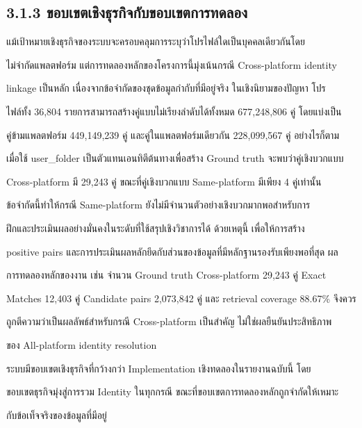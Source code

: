 \documentclass[12pt,a4paper]{report}
\begin{document}
\subsection*{3.1.3 ขอบเขตเชิงธุรกิจกับขอบเขตการทดลอง}
แม้เป้าหมายเชิงธุรกิจของระบบจะครอบคลุมการระบุว่าโปรไฟล์ใดเป็นบุคคลเดียวกันโดย\par
ไม่จำกัดแพลตฟอร์ม แต่การทดลองหลักของโครงการนี้มุ่งเน้นกรณี Cross-platform identity\par
linkage เป็นหลัก เนื่องจากข้อจำกัดของชุดข้อมูลกำกับที่มีอยู่จริง ในเชิงนิยามของปัญหา โปร\par
ไฟล์ทั้ง 36,804 รายการสามารถสร้างคู่แบบไม่เรียงลำดับได้ทั้งหมด 677,248,806 คู่ โดยแบ่งเป็น\par
คู่ข้ามแพลตฟอร์ม 449,149,239 คู่ และคู่ในแพลตฟอร์มเดียวกัน 228,099,567 คู่ อย่างไรก็ตาม\par
เมื่อใช้ user\_folder เป็นตัวแทนเอนทิตีต้นทางเพื่อสร้าง Ground truth จะพบว่าคู่เชิงบวกแบบ\par
Cross-platform มี 29,243 คู่ ขณะที่คู่เชิงบวกแบบ Same-platform มีเพียง 4 คู่เท่านั้น\par
ข้อจำกัดนี้ทำให้กรณี Same-platform ยังไม่มีจำนวนตัวอย่างเชิงบวกมากพอสำหรับการ\par
ฝึกและประเมินผลอย่างมั่นคงในระดับที่ใช้สรุปเชิงวิชาการได้ ด้วยเหตุนี้ เพื่อให้การสร้าง\par
positive pairs และการประเมินผลหลักยึดกับส่วนของข้อมูลที่มีหลักฐานรองรับเพียงพอที่สุด ผล\par
การทดลองหลักของงาน เช่น จำนวน Ground truth Cross-platform 29,243 คู่ Exact\par
Matches 12,403 คู่ Candidate pairs 2,073,842 คู่ และ retrieval coverage 88.67\% จึงควร\par
ถูกตีความว่าเป็นผลลัพธ์สำหรับกรณี Cross-platform เป็นสำคัญ ไม่ใช่ผลยืนยันประสิทธิภาพ\par
ของ All-platform identity resolution\par
ระบบมีขอบเขตเชิงธุรกิจที่กว้างกว่า Implementation เชิงทดลองในรายงานฉบับนี้ โดย\par
ขอบเขตธุรกิจมุ่งสู่การรวม Identity ในทุกกรณี ขณะที่ขอบเขตการทดลองหลักถูกจำกัดให้เหมาะ\par
กับข้อเท็จจริงของข้อมูลที่มีอยู่\par
\end{document}
